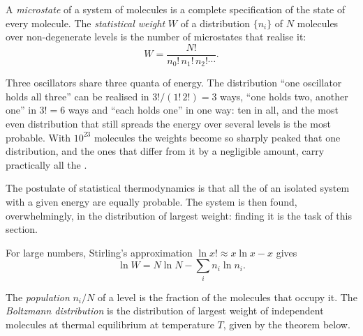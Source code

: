 \begin{definition}\label{def:b3:partition-functions:microstate}
A \emph{microstate} of a system of molecules is a complete
specification of the state of every molecule. The \emph{statistical
weight} $W$ of a distribution $\{n_i\}$ of $N$ molecules over
non-degenerate levels is the number of microstates that realise it:
\[
  W = \frac{N!}{n_0!\,n_1!\,n_2!\cdots}.
\]
\end{definition}

\begin{example}\label{ex:b3:partition-functions:three-quanta}
Three oscillators share three quanta of energy. The distribution ``one
oscillator holds all three'' can be realised in $3!/(1!\,2!) = 3$ ways, ``one
holds two, another one'' in $3! = 6$ ways and ``each holds one'' in one way:
ten  in all, and the most even distribution that still spreads the
energy over several levels is the most probable. With $10^{23}$ molecules the
weights become so sharply peaked that one distribution, and the ones that differ
from it by a negligible amount, carry practically all the .
\end{example}

\begin{remark}
The postulate of statistical thermodynamics is that all the  of an
isolated system with a given energy are equally probable. The system is then
found, overwhelmingly, in the distribution of largest weight: finding it is the
task of this section.
\end{remark}

For large numbers, Stirling's approximation $\ln x! \approx x\ln x - x$ gives
\[
  \ln W = N\ln N - \sum_i n_i\ln n_i .
\]

\begin{definition}\label{def:b3:partition-functions:boltzmann}
The \emph{population} $n_i/N$ of a level is the fraction of the
molecules that occupy it. The \emph{Boltzmann distribution}
is the distribution of largest weight of independent molecules at
thermal equilibrium at temperature $T$, given by the theorem below.
\end{definition}


